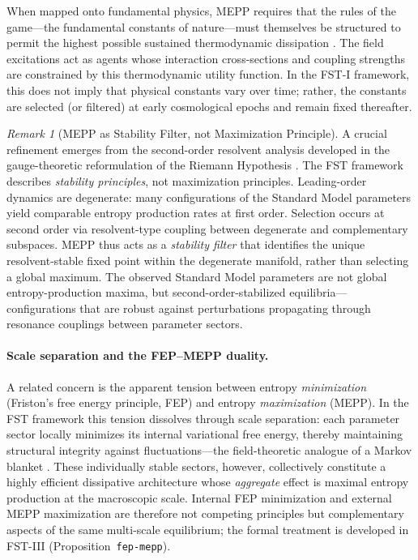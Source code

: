 \documentclass[12pt,a4paper]{article}
\theoremstyle{remark}
\newtheorem{remark}{Remark}
\begin{document}
When mapped onto fundamental physics, MEPP requires that the rules of the game---the fundamental constants of nature---must themselves be structured to permit the highest possible sustained thermodynamic dissipation \citep{EntropyMaximum}. The field excitations act as agents whose interaction cross-sections and coupling strengths are constrained by this thermodynamic utility function. In the FST-I framework, this does not imply that physical constants vary over time; rather, the constants are selected (or filtered) at early cosmological epochs and remain fixed thereafter.

\begin{remark}[MEPP as Stability Filter, not Maximization Principle]
\label{rem:mepp-stability-filter}
A crucial refinement emerges from the second-order resolvent analysis developed in the gauge-theoretic reformulation of the Riemann Hypothesis \citep{GeigerRH2026b}. The FST framework describes \emph{stability principles}, not maximization principles. Leading-order dynamics are degenerate: many configurations of the Standard Model parameters yield comparable entropy production rates at first order. Selection occurs at second order via resolvent-type coupling between degenerate and complementary subspaces. MEPP thus acts as a \emph{stability filter} that identifies the unique resolvent-stable fixed point within the degenerate manifold, rather than selecting a global maximum. The observed Standard Model parameters are not global entropy-production maxima, but second-order-stabilized equilibria---configurations that are robust against perturbations propagating through resonance couplings between parameter sectors.
\end{remark}

\paragraph{Scale separation and the FEP--MEPP duality.}
A related concern is the apparent tension between entropy \emph{minimization} (Friston's free energy principle, FEP) and entropy \emph{maximization} (MEPP). In the FST framework this tension dissolves through scale separation: each parameter sector locally minimizes its internal variational free energy, thereby maintaining structural integrity against fluctuations---the field-theoretic analogue of a Markov blanket \citep{Friston2010}. These individually stable sectors, however, collectively constitute a highly efficient dissipative architecture whose \emph{aggregate} effect is maximal entropy production at the macroscopic scale. Internal FEP minimization and external MEPP maximization are therefore not competing principles but complementary aspects of the same multi-scale equilibrium; the formal treatment is developed in FST-III (Proposition~\texttt{fep-mepp}).
\end{document}
